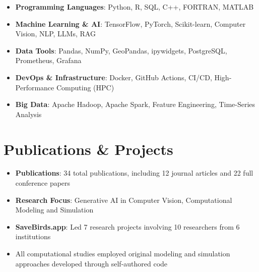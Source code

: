 \documentclass[a4paper,10pt]{article}
\begin{document}
\begin{itemize}
    \item {\bfseries Programming Languages}: Python, R, SQL, C++, FORTRAN, MATLAB
    
    \item {\bfseries Machine Learning \& AI}: TensorFlow, PyTorch, Scikit-learn, Computer Vision, NLP, LLMs, RAG
    
    \item {\bfseries Data Tools}: Pandas, NumPy, GeoPandas, ipywidgets, PostgreSQL, Prometheus, Grafana
    
    \item {\bfseries DevOps \& Infrastructure}: Docker, GitHub Actions, CI/CD, High-Performance Computing (HPC)
    
    \item {\bfseries Big Data}: Apache Hadoop, Apache Spark, Feature Engineering, Time-Series Analysis
\end{itemize}

\section*{Publications \& Projects}

\begin{itemize}
    \item {\bfseries Publications}: 34 total publications, including 12 journal articles and 22 full conference papers
    
    \item {\bfseries Research Focus}: Generative AI in Computer Vision, Computational Modeling and Simulation
    
    \item {\bfseries SaveBirds.app}: Led 7 research projects involving 10 researchers from 6 institutions
    
    \item All computational studies employed original modeling and simulation approaches developed through self-authored code
\end{itemize}
\end{document}
